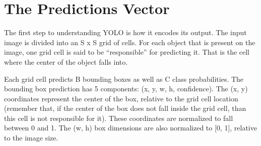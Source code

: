 \section{The Predictions Vector}
The first step to understanding YOLO is how it encodes its output. The input image is divided into an S x S grid of cells. For each object that is present on the image, one grid cell is said to be “responsible” for predicting it. That is the cell where the center of the object falls into.

Each grid cell predicts B bounding boxes as well as C class probabilities. The bounding box prediction has 5 components: (x, y, w, h, confidence). The (x, y) coordinates represent the center of the box, relative to the grid cell location (remember that, if the center of the box does not fall inside the grid cell, than this cell is not responsible for it). These coordinates are normalized to fall between 0 and 1. The (w, h) box dimensions are also normalized to [0, 1], relative to the image size.










{}
\specialsection %
\headerspecialsection

{\hypersetup{urlcolor=ntnu,linkcolor=sophia} %

  
}
